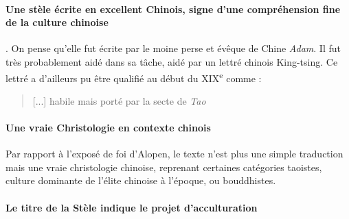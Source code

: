 \paragraph{Une stèle écrite en excellent Chinois, signe d'une compréhension fine de la culture chinoise}. On pense qu'elle fut écrite par le moine perse et évêque de Chine \textit{Adam}. Il fut très probablement aidé dans sa tâche, aidé par un lettré chinois King-tsing\cite[p.~5]{Havret:stelechretienne}.
Ce lettré a d'ailleurs pu être qualifié au début du XIX\textsuperscript{e} comme :
\begin{quote}
    [...] habile mais porté par la secte de \textit{Tao} 
\end{quote}


\paragraph{Une vraie Christologie en contexte chinois} Par rapport à l'exposé de foi d'Alopen, le texte n'est plus une simple traduction mais une vraie christologie chinoise, reprenant certaines catégories taoistes, culture dominante de l'élite chinoise à l'époque, ou bouddhistes.

\paragraph{Le titre de la Stèle indique le projet d'acculturation}

